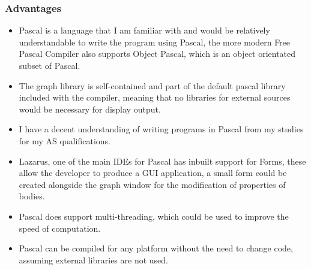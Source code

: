 \subsubsection*{Advantages}
\begin{itemize}
\item Pascal is a language that I am familiar with and would be relatively understandable to write the program using Pascal, the more modern Free Pascal Compiler also supports Object Pascal, which is an object orientated subset of Pascal.
\item The graph library is self-contained and part of the default pascal library included with the compiler, meaning that no libraries for external sources would be necessary for display output.
\item I have a decent understanding of writing programs in Pascal from my studies for my AS qualifications.
\item Lazarus, one of the main IDEs for Pascal has inbuilt support for Forms, these allow the developer to produce a GUI application, a small form could be created alongside the graph window for the modification of properties of bodies.
\item Pascal does support multi-threading, which could be used to improve the speed of computation.
\item Pascal can be compiled for any platform without the need to change code, assuming external libraries are not used.
\end{itemize}
